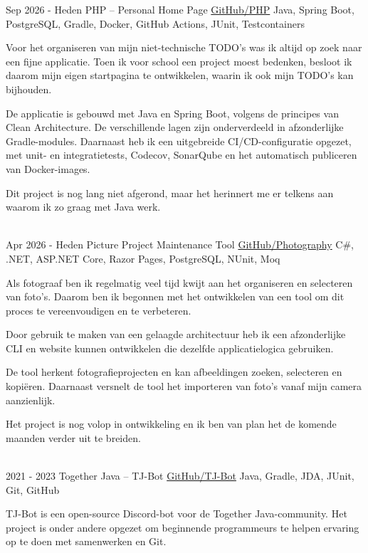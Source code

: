 \documentclass[letterpaper]{twentysecondcv_nederlands}
\begin{document}
\begin{twenty}

    \twentyitem
    {Sep 2026 -}
    {Heden}
    {PHP -- Personal Home Page}
    {\href{https://github.com/Tais993/PHP}{GitHub/PHP}}
    {Java, Spring Boot, PostgreSQL, Gradle, Docker, GitHub Actions, JUnit, Testcontainers}
    {
        Voor het organiseren van mijn niet-technische TODO's was ik altijd
        op zoek naar een fijne applicatie. Toen ik voor school een project
        moest bedenken, besloot ik daarom mijn eigen startpagina te
        ontwikkelen, waarin ik ook mijn TODO's kan bijhouden.

        De applicatie is gebouwd met Java en Spring Boot, volgens de
        principes van Clean Architecture. De verschillende lagen zijn
        onderverdeeld in afzonderlijke Gradle-modules. Daarnaast heb ik
        een uitgebreide CI/CD-configuratie opgezet, met unit- en
        integratietests, Codecov, SonarQube en het automatisch publiceren
        van Docker-images.

        Dit project is nog lang niet afgerond, maar het herinnert me er
        telkens aan waarom ik zo graag met Java werk.
    }\\

    \twentyitem
    {Apr 2026 -}
    {Heden}
    {Picture Project Maintenance Tool}
    {\href{https://github.com/Tais993/Photography}{GitHub/Photography}}
    {C\#, .NET, ASP.NET Core, Razor Pages, PostgreSQL, NUnit, Moq}
    {
        Als fotograaf ben ik regelmatig veel tijd kwijt aan het
        organiseren en selecteren van foto's. Daarom ben ik begonnen
        met het ontwikkelen van een tool om dit proces te vereenvoudigen
        en te verbeteren.

        Door gebruik te maken van een gelaagde architectuur heb ik een
        afzonderlijke CLI en website kunnen ontwikkelen die dezelfde
        applicatielogica gebruiken.

        De tool herkent fotografieprojecten en kan afbeeldingen zoeken,
        selecteren en kopiëren. Daarnaast versnelt de tool het importeren
        van foto's vanaf mijn camera aanzienlijk.

        Het project is nog volop in ontwikkeling en ik ben van plan het
        de komende maanden verder uit te breiden.
    }\\

    \twentyitem
    {2021 -}
    {2023}
    {Together Java -- TJ-Bot}
    {\href{https://github.com/Together-Java/TJ-Bot}{GitHub/TJ-Bot}}
    {Java, Gradle, JDA, JUnit, Git, GitHub}
    {
        TJ-Bot is een open-source Discord-bot voor de Together
        Java-community. Het project is onder andere opgezet om
        beginnende programmeurs te helpen ervaring op te doen met
        samenwerken en Git.

}
\end{twenty}
\end{document}
